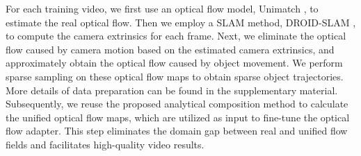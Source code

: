 For each training video, we first use an optical flow model, Unimatch \cite{xu2023unifying}, to estimate the real optical flow. Then we employ a SLAM method, DROID-SLAM \cite{teed2021droid}, to compute the camera extrinsics for each frame. Next, we eliminate the optical flow caused by camera motion based on the estimated camera extrinsics, and approximately obtain the optical flow caused by object movement. We perform sparse sampling \cite{zhan2019self} on these optical flow maps to obtain sparse object trajectories. More details of data preparation can be found in the supplementary material. Subsequently, we reuse the proposed analytical composition method to calculate the unified optical flow maps, which are utilized as input to fine-tune the optical flow adapter. This step eliminates the domain gap between real and unified flow fields and facilitates high-quality video results.
